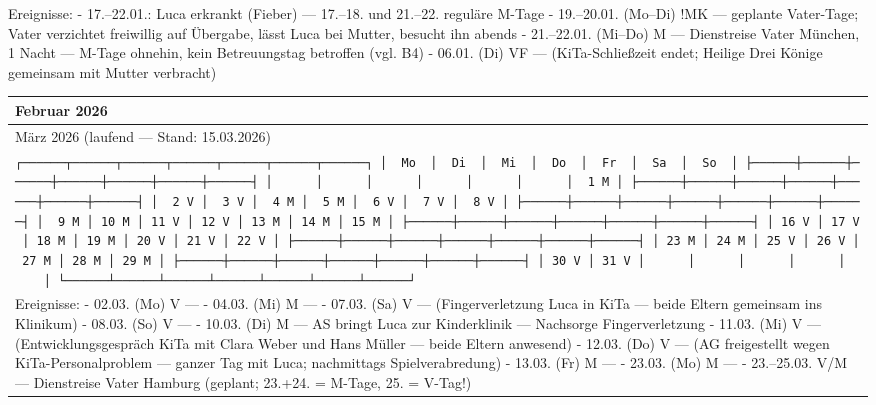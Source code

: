 Ereignisse: - 17.--22.01.: Luca erkrankt (Fieber) --- 17.--18. und
21.--22. reguläre M-Tage - 19.--20.01. (Mo--Di) !MK --- geplante
Vater-Tage; Vater verzichtet freiwillig auf Übergabe, lässt Luca bei
Mutter, besucht ihn abends - 21.--22.01. (Mi--Do) M --- Dienstreise
Vater München, 1 Nacht --- M-Tage ohnehin, kein Betreuungstag betroffen
(vgl. B4) - 06.01. (Di) VF --- (KiTa-Schließzeit endet; Heilige Drei
Könige gemeinsam mit Mutter verbracht)

{\def\LTcaptype{none} %
\begin{longtable}[]{@{}
  >{\raggedright\arraybackslash}p{}@{}}
\toprule\noalign{}
\begin{minipage}[b]{\linewidth}\raggedright
Februar 2026
\end{minipage} \\
\midrule\noalign{}
\endhead
\bottomrule\noalign{}
\endlastfoot
März 2026 (laufend --- Stand: 15.03.2026) \\
\texttt{┌──────┬──────┬──────┬──────┬──────┬──────┬──────┐\ │\ \ Mo\ \ │\ \ Di\ \ │\ \ Mi\ \ │\ \ Do\ \ │\ \ Fr\ \ │\ \ Sa\ \ │\ \ So\ \ │\ ├──────┼──────┼──────┼──────┼──────┼──────┼──────┤\ │\ \ \ \ \ \ │\ \ \ \ \ \ │\ \ \ \ \ \ │\ \ \ \ \ \ │\ \ \ \ \ \ │\ \ \ \ \ \ │\ \ 1\ M\ │\ ├──────┼──────┼──────┼──────┼──────┼──────┼──────┤\ │\ \ 2\ V\ │\ \ 3\ V\ │\ \ 4\ M\ │\ \ 5\ M\ │\ \ 6\ V\ │\ \ 7\ V\ │\ \ 8\ V\ │\ ├──────┼──────┼──────┼──────┼──────┼──────┼──────┤\ │\ \ 9\ M\ │\ 10\ M\ │\ 11\ V\ │\ 12\ V\ │\ 13\ M\ │\ 14\ M\ │\ 15\ M\ │\ ├──────┼──────┼──────┼──────┼──────┼──────┼──────┤\ │\ 16\ V\ │\ 17\ V\ │\ 18\ M\ │\ 19\ M\ │\ 20\ V\ │\ 21\ V\ │\ 22\ V\ │\ ├──────┼──────┼──────┼──────┼──────┼──────┼──────┤\ │\ 23\ M\ │\ 24\ M\ │\ 25\ V\ │\ 26\ V\ │\ 27\ M\ │\ 28\ M\ │\ 29\ M\ │\ ├──────┼──────┼──────┼──────┼──────┼──────┼──────┤\ │\ 30\ V\ │\ 31\ V\ │\ \ \ \ \ \ │\ \ \ \ \ \ │\ \ \ \ \ \ │\ \ \ \ \ \ │\ \ \ \ \ \ │\ └──────┴──────┴──────┴──────┴──────┴──────┴──────┘} \\
Ereignisse: - 02.03. (Mo) V --- - 04.03. (Mi) M --- - 07.03. (Sa) V ---
(Fingerverletzung Luca in KiTa --- beide Eltern gemeinsam ins Klinikum)
- 08.03. (So) V --- - 10.03. (Di) M --- AS bringt Luca zur Kinderklinik
--- Nachsorge Fingerverletzung - 11.03. (Mi) V --- (Entwicklungsgespräch
KiTa mit Clara Weber und Hans Müller --- beide Eltern anwesend) - 12.03.
(Do) V --- (AG freigestellt wegen KiTa-Personalproblem --- ganzer Tag
mit Luca; nachmittags Spielverabredung) - 13.03. (Fr) M --- - 23.03.
(Mo) M --- - 23.--25.03. V/M --- Dienstreise Vater Hamburg (geplant;
23.+24. = M-Tage, 25. = V-Tag!) \\
\end{longtable}
}

